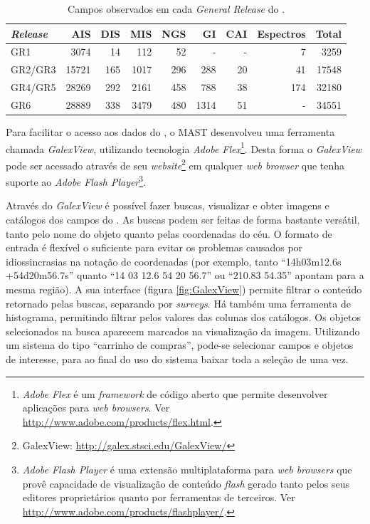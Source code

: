 \begin{table}
	\caption[Campos observados em cada {\em General Release} do \galex.]{Campos
	observados em cada {\em General Release} do \galex.}
	\begin{tabular}{l r r r r r r r r}
		{\em Release} & AIS   & DIS & MIS  & NGS & GI   & CAI & Espectros & Total \\
		\midrule
		GR1           & 3074  & 14  & 112  & 52  & -    & -   & 7         & 3259  \\
		GR2/GR3       & 15721 & 165 & 1017 & 296 & 288  & 20  & 41        & 17548 \\
		GR4/GR5       & 28269 & 292 & 2161 & 458 & 788  & 38  & 174       & 32180 \\
		GR6           & 28889 & 338 & 3479 & 480 & 1314 & 51  & -         & 34551 \\
	\end{tabular}
	\label{tab:GalexReleases}
\end{table}

Para facilitar o acesso aos dados do \galex, o MAST desenvolveu uma ferramenta
chamada {\em GalexView}, utilizando tecnologia {\em Adobe Flex}\footnote{{\em
Adobe Flex} é um {\em framework} de código aberto que permite desenvolver
aplicações para {\em web browsers}. Ver
\url{http://www.adobe.com/products/flex.html}.}. Desta forma o {\em GalexView }
pode ser acessado através de seu {\em website}\footnote{GalexView:
\url{http://galex.stsci.edu/GalexView/}} em qualquer {\em web browser} que tenha
suporte ao {\em Adobe Flash Player}\footnote{{\em Adobe Flash Player} é uma
extensão multiplataforma para {\em web browsers} que provê capacidade de
visualização de conteúdo {\em flash} gerado tanto pelos seus editores
proprietários quanto por ferramentas de terceiros. Ver
\url{http://www.adobe.com/products/flashplayer/}.}.

Através do {\em GalexView} é possível fazer buscas, visualizar e obter imagens e
catálogos dos campos do \galex. As buscas podem ser feitas de forma bastante
versátil, tanto pelo nome do objeto quanto pelas coordenadas do céu. O formato
de entrada é flexível o suficiente para evitar os problemas causados por
idiossincrasias na notação de coordenadas (por exemplo, tanto ``14h03m12.6s
+54d20m56.7s'' quanto ``14 03 12.6 54 20 56.7'' ou ``210.83 54.35'' apontam para
a mesma região). A sua interface (figura \ref{fig:GalexView}) permite filtrar o
conteúdo retornado pelas buscas, separando por {\em surveys}. Há também uma
ferramenta de histograma, permitindo filtrar pelos valores das colunas dos
catálogos. Os objetos selecionados na busca aparecem marcados na visualização da
imagem. Utilizando um sistema do tipo ``carrinho de compras'', pode-se
selecionar campos e objetos de interesse, para ao final do uso do sistema baixar
toda a seleção de uma vez.

